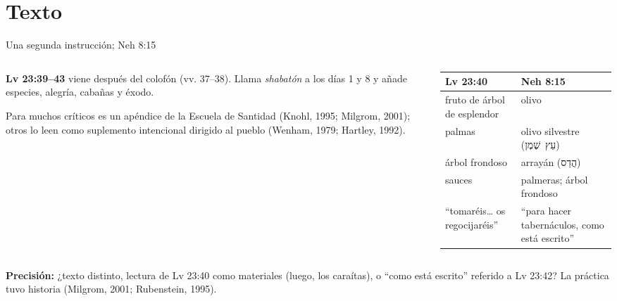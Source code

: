 \documentclass[hyperref={bookmarks=false},aspectratio=169]{beamer}
\newcommand{\heb}[1]{\mbox{\foreignlanguage{hebrew}{#1}}}
\newcommand{\destacar}[1]{\textbf{\textcolor{tierraroja}{#1}}}
\newcommand{\precision}[1]{{\footnotesize\color{sepia}\textbf{Precisión:} #1}}
\begin{document}
\section{Texto}

\begin{frame}{Una segunda instrucción; Neh 8:15}
\begin{columns}[t,onlytextwidth]
\begin{column}{0.47\textwidth}\scriptsize
\destacar{Lv 23:39--43} viene después del colofón (vv. 37--38). Llama \emph{shabatón} a los días 1 y 8 y añade especies, alegría, cabañas y éxodo.\par\smallskip
Para muchos críticos es un apéndice de la Escuela de Santidad (Knohl, 1995; Milgrom, 2001); otros lo leen como suplemento intencional dirigido al pueblo (Wenham, 1979; Hartley, 1992).
\end{column}
\begin{column}{0.51\textwidth}\scriptsize\renewcommand{\arraystretch}{1.12}
\begin{tabular}{@{}L{2.6cm}L{2.9cm}@{}}
\toprule
\textbf{Lv 23:40} & \textbf{Neh 8:15} \\ \midrule
fruto de árbol de esplendor & olivo \\
palmas & olivo silvestre (\heb{עֵץ שֶׁמֶן}) \\
árbol frondoso & arrayán (\heb{הֲדַס}) \\
sauces & palmeras; árbol frondoso \\ \midrule
``tomaréis\ldots{} os regocijaréis'' & ``para hacer tabernáculos, como está escrito'' \\
\bottomrule
\end{tabular}
\end{column}
\end{columns}\par\medskip
\precision{¿texto distinto, lectura de Lv 23:40 como materiales (luego, los caraítas), o ``como está escrito'' referido a Lv 23:42? La práctica tuvo historia (Milgrom, 2001; Rubenstein, 1995).}
\end{frame}
\end{document}
